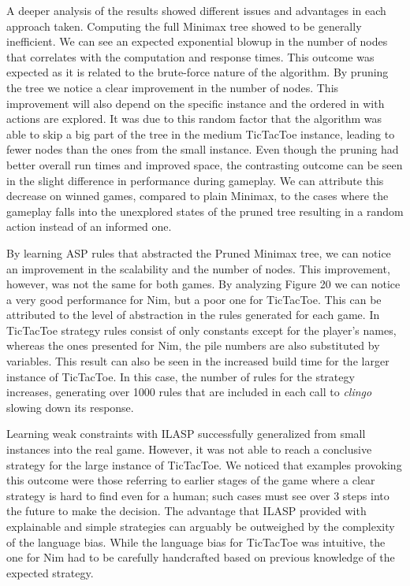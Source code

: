 A deeper analysis of the results showed different issues and advantages in each approach taken. Computing the full Minimax tree showed to be generally inefficient. We can see an expected exponential blowup in the number of nodes that correlates with the computation and response times. This outcome was expected as it is related to the brute-force nature of the algorithm. By pruning the tree we notice a clear improvement in the number of nodes. This improvement will also depend on the specific instance and the ordered in with actions are explored. It was due to this random factor that the algorithm was able to skip a big part of the tree in the medium TicTacToe instance, leading to fewer nodes than the ones from the small instance. Even though the pruning had better overall run times and improved space, the contrasting outcome can be seen in the slight difference in performance during gameplay. We can attribute this decrease on winned games, compared to plain Minimax, to the cases where the gameplay falls into the unexplored states of the pruned tree resulting in a random action instead of an informed one.

By learning ASP rules that abstracted the Pruned Minimax tree, we can notice an improvement in the scalability and the number of nodes. This improvement, however, was not the same for both games. By analyzing Figure 20 we can notice a very good performance for Nim, but a poor one for TicTacToe. This can be attributed to the level of abstraction in the rules generated for each game. In TicTacToe strategy rules consist of only constants except for the player's names, whereas the ones presented for Nim, the pile numbers are also substituted by variables. This result can also be seen in the increased build time for the larger instance of TicTacToe. In this case, the number of rules for the strategy increases, generating over 1000 rules that are included in each call to \textit{clingo} slowing down its response. 


Learning weak constraints with ILASP successfully generalized from small instances into the real game. However, it was not able to reach a conclusive strategy for the large instance of TicTacToe. We noticed that examples provoking this outcome were those referring to earlier stages of the game where a clear strategy is hard to find even for a human; such cases must see over 3 steps into the future to make the decision. The advantage that ILASP provided with explainable and simple strategies can arguably be outweighed by the complexity of the language bias. While the language bias for TicTacToe was intuitive, the one for Nim had to be carefully handcrafted based on previous knowledge of the expected strategy. 
